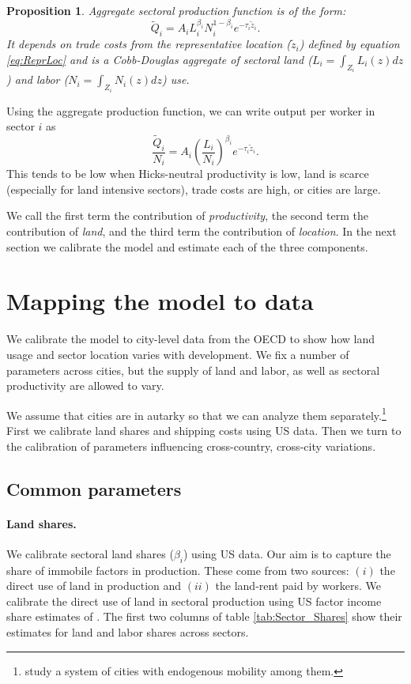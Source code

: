 \documentclass[12pt]{article}
\newtheorem{proposition}{Proposition}
\begin{document}
\begin{proposition}\label{prop:aggregation}
Aggregate sectoral production function is of the form:
\begin{equation}
\tilde Q_i =
A_iL_i^{\beta_i}N_i^{1-\beta_i}
 e^{-\tau_i\tilde z_i}.
\end{equation}
It depends on trade costs from the representative location ($\tilde{z}_i$) defined by equation \eqref{eq:ReprLoc} and is a Cobb-Douglas aggregate of sectoral land ($L_i=\int_{Z_i}L_i(z)dz$) and labor ($N_i=\int_{Z_i}N_i(z)dz$) use.
\end{proposition}

Using the aggregate production function, we can write output per worker in sector $i$ as
\begin{equation}\label{eq:output_per_worker}
\frac{\tilde Q_i}{N_i} = 
A_i
 \left(
 \frac{L_i}
 {N_i}\right)^{\beta_i}e^{-\tau_i\tilde z_i}.
\end{equation}
This tends to be low when Hicks-neutral productivity is low, land is scarce (especially for land intensive sectors), trade costs are high, or cities are large.

We call the first term the contribution of \emph{productivity}, the second term the contribution of \emph{land}, and the third term the contribution of \emph{location}. In the next section we calibrate the model and estimate each of the three components.


\section{Mapping the model to data}
We calibrate the model to city-level data from the OECD to show how land usage and sector location varies with development. We fix a number of parameters across cities, but the supply of land and labor, as well as sectoral productivity are allowed to vary.

We assume that cities are in autarky so that we can analyze them separately.\footnote{ study a system of cities with endogenous mobility among them.} First we calibrate land shares and shipping costs using US data. Then we turn to the calibration of parameters influencing cross-country, cross-city variations.

\subsection{Common parameters}
\paragraph{Land shares.}
We calibrate sectoral land shares ($\beta_i$) using US data. Our aim is to capture the share of immobile factors in production. These come from two sources: $(i)$ the direct use of land in production and $(ii)$ the land-rent paid by workers. We calibrate the direct use of land in sectoral production using US factor income share estimates of . The first two columns of table \ref{tab:Sector_Shares} show their estimates for land and labor shares across sectors.
\end{document}
